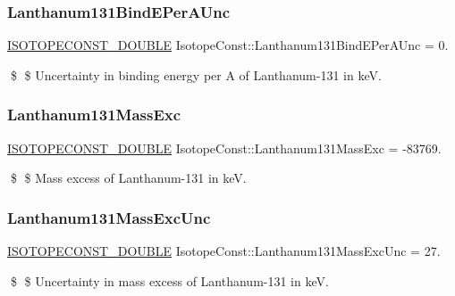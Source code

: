 \subsubsection{\texorpdfstring{Lanthanum131\+Bind\+E\+Per\+A\+Unc}{Lanthanum131BindEPerAUnc}}
{\footnotesize\ttfamily \mbox{\hyperlink{group___isotope_const-_macros_ga8f45a7272ce02c0b4c65c44636ed719a}{I\+S\+O\+T\+O\+P\+E\+C\+O\+N\+S\+T\+\_\+\+D\+O\+U\+B\+LE}} Isotope\+Const\+::\+Lanthanum131\+Bind\+E\+Per\+A\+Unc = 0.}

\$ \$ Uncertainty in binding energy per A of Lanthanum-\/131 in keV. \mbox{\label{group___isotope_const-_lanthanum-_la131_gaa90da27fe629a14c7490727e40910877}} 
\subsubsection{\texorpdfstring{Lanthanum131\+Mass\+Exc}{Lanthanum131MassExc}}
{\footnotesize\ttfamily \mbox{\hyperlink{group___isotope_const-_macros_ga8f45a7272ce02c0b4c65c44636ed719a}{I\+S\+O\+T\+O\+P\+E\+C\+O\+N\+S\+T\+\_\+\+D\+O\+U\+B\+LE}} Isotope\+Const\+::\+Lanthanum131\+Mass\+Exc = -\/83769.}

\$ \$ Mass excess of Lanthanum-\/131 in keV. \mbox{\label{group___isotope_const-_lanthanum-_la131_gaf0f2565b5dba3902a3e99fa0b2f4bffa}} 
\subsubsection{\texorpdfstring{Lanthanum131\+Mass\+Exc\+Unc}{Lanthanum131MassExcUnc}}
{\footnotesize\ttfamily \mbox{\hyperlink{group___isotope_const-_macros_ga8f45a7272ce02c0b4c65c44636ed719a}{I\+S\+O\+T\+O\+P\+E\+C\+O\+N\+S\+T\+\_\+\+D\+O\+U\+B\+LE}} Isotope\+Const\+::\+Lanthanum131\+Mass\+Exc\+Unc = 27.}

\$ \$ Uncertainty in mass excess of Lanthanum-\/131 in keV. \mbox{\label{group___isotope_const-_lanthanum-_la131_gaed1d67ee75a54ac30db9477165f2f3fb}} 
